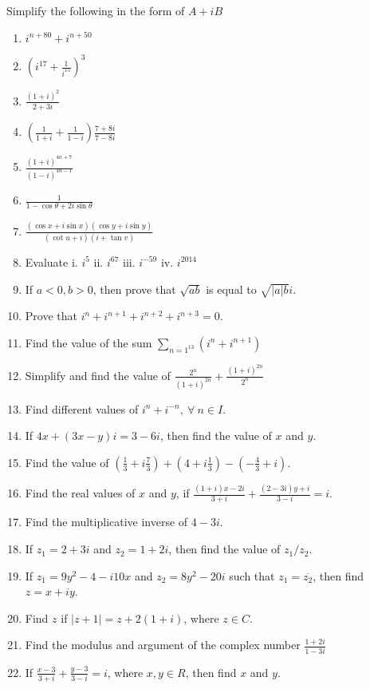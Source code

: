 \noindent Simplify the following in the form of $A + iB$

\begin{enumerate}[resume]
\item $i^{n + 80} + i^{n + 50}$
\item $\left(i^{17} + \frac{1}{i^{15}}\right)^3$
\item $\frac{(1 + i)^2}{2 + 3i}$
\item $\left(\frac{1}{1 + i} + \frac{1}{1 - i}\right)\frac{7 + 8i}{7 - 8i}$
\item $\frac{(1 + i)^{4n + 7}}{(1 - i)^{4n - 1}}$
\item $\frac{1}{1 - \cos\theta + 2i\sin\theta}$
\item $\frac{(\cos x + i\sin x)(\cos y + i\sin y)}{(\cot u + i)(i + \tan v)}$
\item Evaluate i. $i^5$ ii. $i^{67}$ iii. $i^{-59}$ iv. $i^{2014}$
\item If $a<0, b>0$, then prove that $\sqrt{ab}$ is equal to $\sqrt{|a|b}i$.
\item Prove that $i^n + i^{n + 1} + i^{n + 2} + i^{n + 3} = 0$.
\item Find the value of the sum $\sum_{n = 1^13}(i^n + i^{n + 1})$
\item Simplify and find the value of $\frac{2^n}{(1 + i)^{2n}} + \frac{(1 + i)^{2n}}{2^n}$
\item Find different values of $i^n + i^{-n}, ~\forall~n\in I$.
\item If $4x + (3x - y)i = 3 - 6i$, then find the value of $x$ and $y$.
\item Find the value of $\left(\frac{1}{3} + i\frac{7}{3}\right) + \left(4 + i\frac{1}{3}\right) - \left(-\frac{4}{3} + i\right)$.
\item Find the real values of $x$ and $y$, if $\frac{(1 + i)x - 2i}{3 + i} + \frac{(2 - 3i)y + i}{3 - i} = i$.
\item Find the multiplicative inverse of $4 - 3i$.
\item If $z_1 = 2 + 3i$ and $z_2 = 1 + 2i$, then find the value of $z_1/z_2$.
\item If $z_1 = 9y^2 - 4 -i10x$ and $z_2 = 8y^2 -20i$ such that $z_1 = \overline{z_2}$, then find $z = x + iy$.
\item Find $z$ if $|z + 1| = z + 2(1 + i)$, where $z\in C$.
\item Find the modulus and argument of the complex number $\frac{1 + 2i}{1 - 3i}$
\item If $\frac{x - 3}{3 + i} + \frac{y - 3}{3 - i} = i$, where $x, y \in R$, then find $x$ and $y$.

\end{enumerate}
